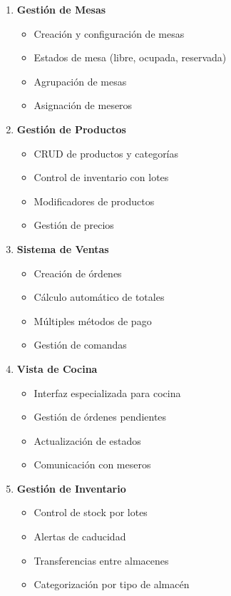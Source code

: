 \documentclass[12pt,a4paper]{article}
\begin{document}
\begin{enumerate}
    \item \textbf{Gestión de Mesas}
    \begin{itemize}
        \item Creación y configuración de mesas
        \item Estados de mesa (libre, ocupada, reservada)
        \item Agrupación de mesas
        \item Asignación de meseros
    \end{itemize}
    
    \item \textbf{Gestión de Productos}
    \begin{itemize}
        \item CRUD de productos y categorías
        \item Control de inventario con lotes
        \item Modificadores de productos
        \item Gestión de precios
    \end{itemize}
    
    \item \textbf{Sistema de Ventas}
    \begin{itemize}
        \item Creación de órdenes
        \item Cálculo automático de totales
        \item Múltiples métodos de pago
        \item Gestión de comandas
    \end{itemize}
    
    \item \textbf{Vista de Cocina}
    \begin{itemize}
        \item Interfaz especializada para cocina
        \item Gestión de órdenes pendientes
        \item Actualización de estados
        \item Comunicación con meseros
    \end{itemize}
    
    \item \textbf{Gestión de Inventario}
    \begin{itemize}
        \item Control de stock por lotes
        \item Alertas de caducidad
        \item Transferencias entre almacenes
        \item Categorización por tipo de almacén
    \end{itemize}
    

\end{enumerate}
\end{document}
